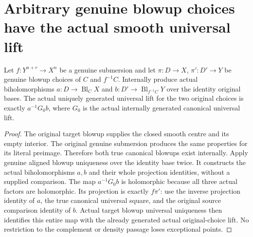 \section{Arbitrary genuine blowup choices have the actual smooth universal lift}

\begin{lemma}
\label{hir:submersion-blowup-choice-actual-conjugate}
\leanok
{}
Let $f:Y^{n+r}\to X^n$ be a genuine submersion and let $\pi:D\to X$,
$\pi':D'\to Y$ be genuine blowup choices of $C$ and $f^{-1}C$. Internally
produce actual biholomorphisms $a:D\to\operatorname{Bl}_C X$ and
$b:D'\to\operatorname{Bl}_{f^{-1}C}Y$ over the identity original bases.
The actual uniquely generated universal lift for the two original choices
is exactly $a^{-1}G_0 b$, where $G_0$ is the actual internally generated
canonical universal lift.
\end{lemma}
\begin{proof}
The original target blowup supplies the closed smooth centre and its empty
interior. The original genuine submersion produces the same properties for
its literal preimage. Therefore both true canonical blowups exist internally.
Apply genuine aligned blowup uniqueness over the identity base twice. It
constructs the actual biholomorphisms $a,b$ and their whole projection
identities, without a supplied comparison. The map $a^{-1}G_0b$ is holomorphic
because all three actual factors are holomorphic. Its projection is exactly
$f\pi'$: use the inverse projection identity of $a$, the true canonical
universal square, and the original source comparison identity of $b$.
Actual target blowup universal uniqueness then identifies this entire map
with the already generated actual original-choice lift. No restriction to
the complement or density passage loses exceptional points.
\end{proof}

